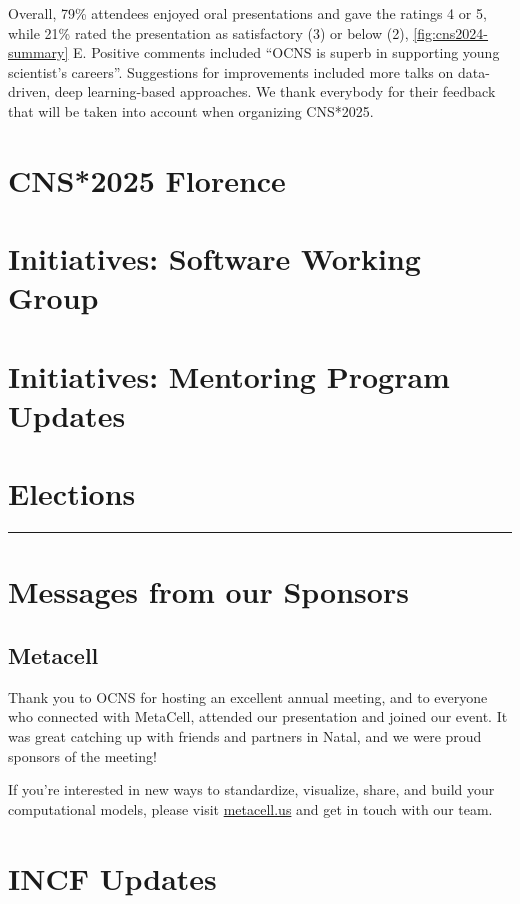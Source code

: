 \documentclass[11pt,a4paper,oneside]{article}
\begin{document}
Overall, 79\% attendees enjoyed oral presentations and gave the ratings 4 or 5, while 21\% rated the presentation as satisfactory (3) or below (2), \cref{fig:cns2024-summary} E.
Positive comments included \enquote{OCNS is superb in supporting young scientist's careers}.
Suggestions for improvements included more talks on data-driven, deep learning-based approaches.
We thank everybody for their feedback that will be taken into account when organizing CNS*2025.


\newpage

\section*{CNS*2025 Florence}%
\lipsum[1-3]

\newpage
\section*{Initiatives: Software Working Group}%
\lipsum[1-3]

\newpage
\section*{Initiatives: Mentoring Program Updates}%
\lipsum[1-3]

\newpage
\section*{Elections}%
\rule{\textwidth}{0.4pt}
\lipsum[1-3]

\newpage

\newpage

\newpage
\section*{Messages from our Sponsors}%
\subsection*{Metacell}%
\begin{displayquote}
  Thank you to OCNS for hosting an excellent annual meeting, and to everyone who connected with MetaCell, attended our presentation and joined our event.
  It was great catching up with friends and partners in Natal, and we were proud sponsors of the meeting!

  If you're interested in new ways to standardize, visualize, share, and build your computational models, please visit \url{metacell.us} and get in touch with our team.
\end{displayquote}

\newpage
\section*{INCF Updates}%
\lipsum[1-3]
\end{document}
